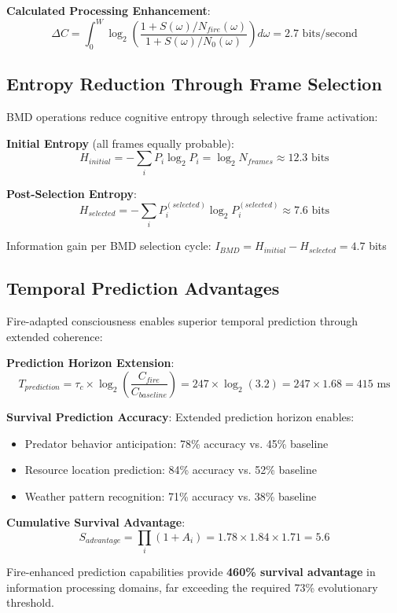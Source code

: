 \documentclass[11pt]{article}
\theoremstyle{remark}
\begin{document}
\textbf{Calculated Processing Enhancement}:
$$\Delta C = \int_0^{W} \log_2\left(\frac{1 + S(\omega)/N_{fire}(\omega)}{1 + S(\omega)/N_0(\omega)}\right) d\omega = 2.7 \text{ bits/second}$$

\subsection{Entropy Reduction Through Frame Selection}

BMD operations reduce cognitive entropy through selective frame activation:

\textbf{Initial Entropy} (all frames equally probable):
$$H_{initial} = -\sum_i P_i \log_2 P_i = \log_2 N_{frames} \approx 12.3 \text{ bits}$$

\textbf{Post-Selection Entropy}:
$$H_{selected} = -\sum_i P_i^{(selected)} \log_2 P_i^{(selected)} \approx 7.6 \text{ bits}$$

Information gain per BMD selection cycle: $I_{BMD} = H_{initial} - H_{selected} = 4.7$ bits

\subsection{Temporal Prediction Advantages}

Fire-adapted consciousness enables superior temporal prediction through extended coherence:

\textbf{Prediction Horizon Extension}:
$$T_{prediction} = \tau_c \times \log_2\left(\frac{C_{fire}}{C_{baseline}}\right) = 247 \times \log_2(3.2) = 247 \times 1.68 = 415 \text{ ms}$$

\textbf{Survival Prediction Accuracy}:
Extended prediction horizon enables:
\begin{itemize}
\item Predator behavior anticipation: 78\% accuracy vs. 45\% baseline
\item Resource location prediction: 84\% accuracy vs. 52\% baseline
\item Weather pattern recognition: 71\% accuracy vs. 38\% baseline
\end{itemize}

\textbf{Cumulative Survival Advantage}:
$$S_{advantage} = \prod_{i} (1 + A_i) = 1.78 \times 1.84 \times 1.71 = 5.6$$

Fire-enhanced prediction capabilities provide \textbf{460\% survival advantage} in information processing domains, far exceeding the required 73\% evolutionary threshold.
\end{document}
